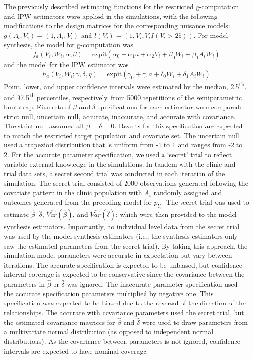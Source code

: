 \documentclass[]{article}
\begin{document}
The previously described estimating functions for the restricted g-computation and IPW estimators were applied in the simulations, with the following modifications to the design matrices for the corresponding nuisance models: $g(A_i, V_i) = (1, A_i, V_i)$ and $l(V_i) = (1, V_i, V_i I(V_i > 25))$. For model synthesis, the model for g-computation was
\[f_a(V_i, W_i; \alpha, \beta) = \text{expit}(\alpha_0 + \alpha_1 a + \alpha_2 V_i + \beta_0 W_i + \beta_1 A_i W_i)\]
and the model for the IPW estimator was
\[h_a(V_i, W_i; \gamma, \delta, \eta) = \text{expit}(\gamma_0 + \gamma_1 a + \delta_0 W_i + \delta_1 A_i W_i)\]
Point, lower, and upper confidence intervals were estimated by the median, 2.5\textsuperscript{th}, and 97.5\textsuperscript{th} percentiles, respectively, from 5000 repetitions of the semiparametric bootstrap. Five sets of $\beta$ and $\delta$ specifications for each estimator were compared: strict null, uncertain null, accurate, inaccurate, and accurate with covariance. The strict null assumed all $\beta = \delta = 0$. Results for this specification are expected to match the restricted target population and covariate set. The uncertain null used a trapeziod distribution that is uniform from -1 to 1 and ranges from -2 to 2. For the accurate parameter specification, we used a `secret' trial to reflect variable external knowledge in the simulations. In tandem with the clinic and trial data sets, a secret second trial was conducted in each iteration of the simulation. The secret trial consisted of 2000 observations generated following the covariate pattern in the clinic population with $A_i$ randomly assigned and outcomes generated from the preceding model for $p_{Y_i}$. The secret trial was used to estimate $\hat{\beta}$, $\hat{\delta}$, $\widehat{Var}(\hat{\beta})$, and $\widehat{Var}(\hat{\delta})$; which were then provided to the model synthesis estimators. Importantly, no individual level data from the secret trial was used by the model synthesis estimators (i.e., the synthesis estimators only saw the estimated parameters from the secret trial). By taking this approach, the simulation model parameters were accurate in expectation but vary between iterations. The accurate specification is expected to be unbiased, but confidence interval coverage is expected to be conservative since the covariance between the parameters in $\hat{\beta}$ or $\hat{\delta}$ was ignored. The inaccurate parameter specification used the accurate specification parameters multiplied by negative one. This specification was expected to be biased due to the reversal of the direction of the relationships. The accurate with covariance parameters used the secret trial, but the estimated covariance matrices for $\hat{\beta}$ and $\hat{\delta}$ were used to draw parameters from a multivariate normal distribution (as opposed to independent normal distributions). As the covariance between parameters is not ignored, confidence intervals are expected to have nominal coverage.
\end{document}
